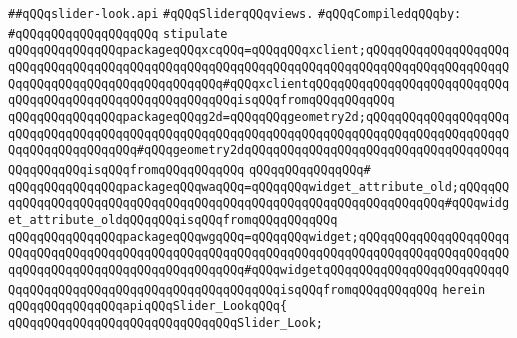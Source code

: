 \label{src/lib/x-kit/widget/old/leaf/slider-look.api}
\verb|##qQQqslider-look.api|\newline
\verb|#qQQqSliderqQQqviews.|\newline
\newline
\verb|#qQQqCompiledqQQqby:|\newline
\verb|#qQQqqQQqqQQqqQQqqQQq|\newline
\newline
\verb|stipulate|\newline
\verb|qQQqqQQqqQQqqQQqpackageqQQqxcqQQq=qQQqqQQqxclient;qQQqqQQqqQQqqQQqqQQqqQQqqQQqqQQqqQQqqQQqqQQqqQQqqQQqqQQqqQQqqQQqqQQqqQQqqQQqqQQqqQQqqQQqqQQqqQQqqQQqqQQqqQQqqQQqqQQqqQQq#qQQqxclientqQQqqQQqqQQqqQQqqQQqqQQqqQQqqQQqqQQqqQQqqQQqqQQqqQQqqQQqqQQqisqQQqfromqQQqqQQqqQQq|\newline
\verb|qQQqqQQqqQQqqQQqpackageqQQqg2d=qQQqqQQqgeometry2d;qQQqqQQqqQQqqQQqqQQqqQQqqQQqqQQqqQQqqQQqqQQqqQQqqQQqqQQqqQQqqQQqqQQqqQQqqQQqqQQqqQQqqQQqqQQqqQQqqQQqqQQqqQQq#qQQqgeometry2dqQQqqQQqqQQqqQQqqQQqqQQqqQQqqQQqqQQqqQQqqQQqqQQqisqQQqfromqQQqqQQqqQQq|\newline
\verb|qQQqqQQqqQQqqQQq#|\newline
\verb|qQQqqQQqqQQqqQQqpackageqQQqwaqQQq=qQQqqQQqwidget_attribute_old;qQQqqQQqqQQqqQQqqQQqqQQqqQQqqQQqqQQqqQQqqQQqqQQqqQQqqQQqqQQqqQQqqQQq#qQQqwidget_attribute_oldqQQqqQQqisqQQqfromqQQqqQQqqQQq|\newline
\verb|qQQqqQQqqQQqqQQqpackageqQQqwgqQQq=qQQqqQQqwidget;qQQqqQQqqQQqqQQqqQQqqQQqqQQqqQQqqQQqqQQqqQQqqQQqqQQqqQQqqQQqqQQqqQQqqQQqqQQqqQQqqQQqqQQqqQQqqQQqqQQqqQQqqQQqqQQqqQQqqQQqqQQq#qQQqwidgetqQQqqQQqqQQqqQQqqQQqqQQqqQQqqQQqqQQqqQQqqQQqqQQqqQQqqQQqqQQqqQQqisqQQqfromqQQqqQQqqQQq|\newline
\verb|herein|\newline
\newline
\verb|qQQqqQQqqQQqqQQqapiqQQqSlider_LookqQQq{|\newline
\newline
\verb|qQQqqQQqqQQqqQQqqQQqqQQqqQQqqQQqSlider_Look;|\newline

